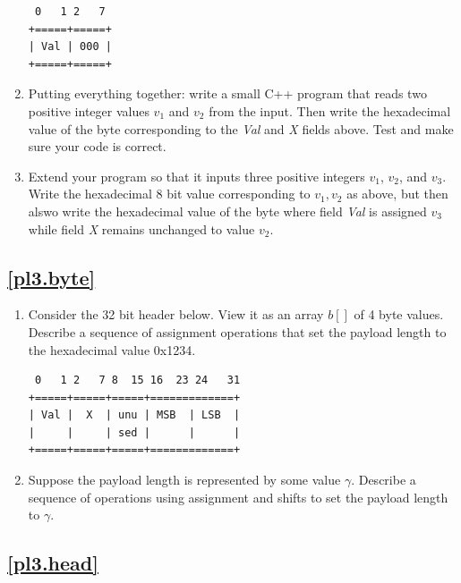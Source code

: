 \documentclass[12pt]{book}
\begin{document}
\begin{enumerate}[resume*]
\begin{verbatim}
 0   1 2   7 
+=====+=====+
| Val | 000 |
+=====+=====+
\end{verbatim}



\item Putting everything together: write a small C++ program that reads two positive integer values $v_1$ and $v_2$ from the input. Then write the hexadecimal value of the byte corresponding to the \emph{Val} and \emph{X} fields above. Test and make sure your code is correct.

\item Extend your program so that it inputs three positive integers $v_1$, $v_2$, and $v_3$. Write the hexadecimal 8 bit value corresponding to $v_1,v_2$ as above, but then alswo write the hexadecimal value of the byte where field \emph{Val} is assigned $v_3$ while field \emph{X} remains unchanged to value $v_2$. 

  
\end{enumerate}


\subsection{\ref{pl3.byte}}\label{header.subsec}

\begin{enumerate}[resume*]
\item Consider the 32 bit header below. View it as an array $b[]$ of 4 byte values. Describe a sequence of assignment operations that set the payload length to the hexadecimal value 0x1234.
 \begin{verbatim}
 0   1 2   7 8  15 16  23 24   31
+=====+=====+=====+=============+
| Val |  X  | unu | MSB  | LSB  |
|     |     | sed |      |      |
+=====+=====+=====+=============+ 
\end{verbatim}

 \item Suppose the payload length is represented by some value $\gamma$. Describe a sequence of operations using assignment and shifts to set the payload length to $\gamma$. 
\end{enumerate}



\subsection{\ref{pl3.head}}\label{headclass.subsec}
\end{document}
